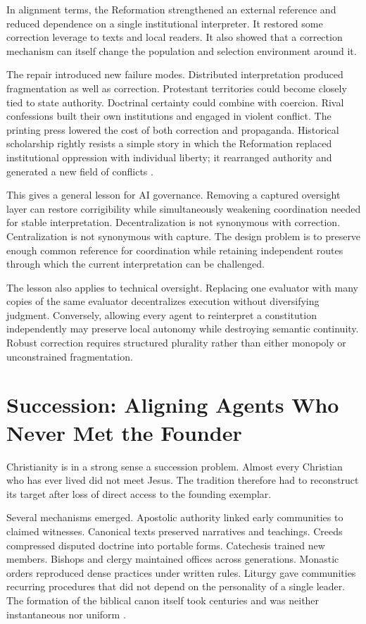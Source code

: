 \documentclass[11pt]{article}
\begin{document}
In alignment terms, the Reformation strengthened an external reference and reduced dependence on a single institutional interpreter. It restored some correction leverage to texts and local readers. It also showed that a correction mechanism can itself change the population and selection environment around it.

The repair introduced new failure modes. Distributed interpretation produced fragmentation as well as correction. Protestant territories could become closely tied to state authority. Doctrinal certainty could combine with coercion. Rival confessions built their own institutions and engaged in violent conflict. The printing press lowered the cost of both correction and propaganda. Historical scholarship rightly resists a simple story in which the Reformation replaced institutional oppression with individual liberty; it rearranged authority and generated a new field of conflicts \parencite{macculloch2003reformation}.

This gives a general lesson for AI governance. Removing a captured oversight layer can restore corrigibility while simultaneously weakening coordination needed for stable interpretation. Decentralization is not synonymous with correction. Centralization is not synonymous with capture. The design problem is to preserve enough common reference for coordination while retaining independent routes through which the current interpretation can be challenged.

The lesson also applies to technical oversight. Replacing one evaluator with many copies of the same evaluator decentralizes execution without diversifying judgment. Conversely, allowing every agent to reinterpret a constitution independently may preserve local autonomy while destroying semantic continuity. Robust correction requires structured plurality rather than either monopoly or unconstrained fragmentation.

\section{Succession: Aligning Agents Who Never Met the Founder}

Christianity is in a strong sense a succession problem. Almost every Christian who has ever lived did not meet Jesus. The tradition therefore had to reconstruct its target after loss of direct access to the founding exemplar.

Several mechanisms emerged. Apostolic authority linked early communities to claimed witnesses. Canonical texts preserved narratives and teachings. Creeds compressed disputed doctrine into portable forms. Catechesis trained new members. Bishops and clergy maintained offices across generations. Monastic orders reproduced dense practices under written rules. Liturgy gave communities recurring procedures that did not depend on the personality of a single leader. The formation of the biblical canon itself took centuries and was neither instantaneous nor uniform \parencite{gallagher2017canon,bokedal2014canon}.
\end{document}
